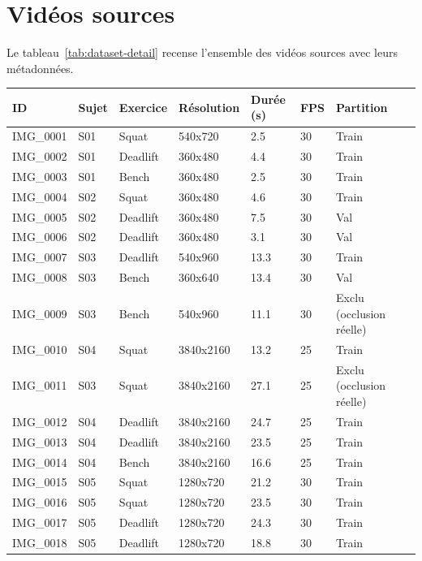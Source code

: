 \section*{Vidéos sources}

Le tableau~\ref{tab:dataset-detail} recense l'ensemble des vidéos
sources avec leurs métadonnées.

\begin{table}[h]
  \centering
  \small
  \begin{tabular}{llllllll}
    \hline
    \textbf{ID} & \textbf{Sujet} & \textbf{Exercice} & \textbf{Résolution} & \textbf{Durée (s)} & \textbf{FPS} & \textbf{Partition} \\
    \hline
    IMG\_0001 & S01 & Squat    & 540x720 & 2.5 & 30 & Train \\
    IMG\_0002 & S01 & Deadlift & 360x480 & 4.4 & 30 & Train \\
    IMG\_0003 & S01 & Bench    & 360x480 & 2.5 & 30 & Train \\
    IMG\_0004 & S02 & Squat    & 360x480 & 4.6 & 30 & Train \\
    IMG\_0005 & S02 & Deadlift & 360x480 & 7.5 & 30 & Val   \\
    IMG\_0006 & S02 & Deadlift & 360x480 & 3.1 & 30 & Val   \\
    IMG\_0007 & S03 & Deadlift & 540x960 & 13.3 & 30 & Train \\
    IMG\_0008 & S03 & Bench    & 360x640 & 13.4 & 30 & Val   \\
    IMG\_0009 & S03 & Bench    & 540x960 & 11.1 & 30 & Exclu (occlusion réelle) \\
    IMG\_0010 & S04 & Squat    & 3840x2160 & 13.2 & 25 & Train \\
    IMG\_0011 & S03 & Squat    & 3840x2160 & 27.1 & 25 & Exclu (occlusion réelle) \\
    IMG\_0012 & S04 & Deadlift & 3840x2160 & 24.7 & 25 & Train \\
    IMG\_0013 & S04 & Deadlift & 3840x2160 & 23.5 & 25 & Train \\
    IMG\_0014 & S04 & Bench    & 3840x2160 & 16.6 & 25 & Train \\
    IMG\_0015 & S05 & Squat    & 1280x720 & 21.2 & 30 & Train \\
    IMG\_0016 & S05 & Squat    & 1280x720 & 23.5 & 30 & Train \\
    IMG\_0017 & S05 & Deadlift & 1280x720 & 24.3 & 30 & Train \\
    IMG\_0018 & S05 & Deadlift & 1280x720 & 18.8 & 30 & Train \\

\end{tabular}
\end{table}

